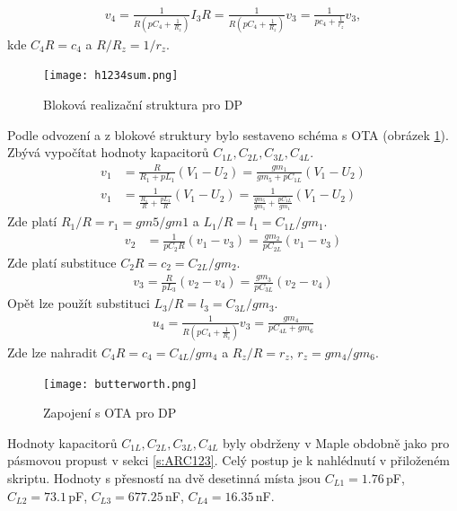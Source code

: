 \begin{align}
v_4 = \frac{1}{R(pC_4 + \frac{1}{R_z})}I_3R = \frac{1}{R(pC_4 + \frac{1}{R_z})}v_3 = \frac{1}{pc_4 + \frac{1}{r_z}}v_3,
\end{align}
kde $C_4R = c_4$ a $R/R_z = 1/r_z$.
\begin{figure}[h]
\centering
\texttt{[image: h1234sum.png]}
\caption{Bloková realizační struktura pro DP}
\end{figure}
Podle odvození a z blokové struktury bylo sestaveno schéma s OTA (obrázek \ref{s:OTADP}). Zbývá vypočítat hodnoty kapacitorů $C_{1L}, C_{2L}, C_{3L}, C_{4L}$.
\begin{align}
v_1 &= \frac{R}{R_1 + pL_1}(V_1 - U_2) = \frac{gm_1}{gm_5 + pC_{1L}}(V_1 - U_2)\\
v_1 &= \frac{1}{\frac{R_1}{R} + \frac{pL_1}{R}}(V_1 - U_2) = \frac{1}{\frac{gm_5}{gm_1} + \frac{pC_{1L}}{gm_1}}(V_1 - U_2)
\end{align}
Zde platí $R_1/R = r_1 = gm5/gm1$ a $L_1/R = l_1 = C_{1L}/gm_1$.
\begin{align}
v_2 &= \frac{1}{pC_2R}(v_1 - v_3) = \frac{gm_2}{pC_{2L}}(v_1 - v_3)
\end{align}
Zde platí substituce $C_2R = c_2 = C_{2L}/gm_2$.
\begin{align}
v_3 = \frac{R}{pL_3}(v_2 - v_4) = \frac{gm_3}{pC_{3L}}(v_2 - v_4)
\end{align}
Opět lze použít substituci $L_3/R = l_3 = C_{3L}/gm_3$.
\begin{align}
u_4 = \frac{1}{R(pC_4 + \frac{1}{R_z})}v_3 = \frac{gm_4}{pC_{4L} + gm_6}
\end{align}
Zde lze nahradit $C_4R = c_4 = C_{4L}/gm_4$ a $R_z/R = r_z$, $r_z = gm_4/gm_6$.
\begin{figure}[H]
\centering
\texttt{[image: butterworth.png]}
\caption{Zapojení s OTA pro DP \label{s:OTADP}}
\end{figure}
\noindent Hodnoty kapacitorů $C_{1L}, C_{2L}, C_{3L}, C_{4L}$ byly obdrženy v Maple obdobně jako pro pásmovou propust v sekci \ref{s:ARC123}. Celý postup je k nahlédnutí v přiloženém skriptu. Hodnoty s přesností na dvě desetinná místa jsou $C_{L1} = 1.76$\,pF, $C_{L2} = 73.1$\,pF, $C_{L3} = 677.25$\,nF, $C_{L4} = 16.35$\,nF.
